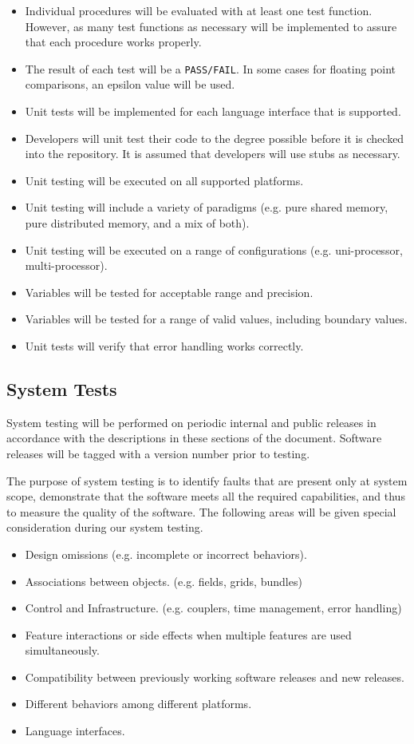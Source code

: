 \begin{itemize}
\item Individual procedures will be evaluated with at least one test function.  However,
as many test functions as necessary will be implemented to assure that 
each procedure works properly.  
\item The result of each test will be a {\tt PASS/FAIL}.  
In some cases for floating point comparisons, an epsilon value will be used.
\item Unit tests will be implemented for each language interface that is 
supported.
\item Developers will unit test their code to the degree possible  
before it is checked into the repository.  It is assumed that 
developers will use stubs as necessary.
\item Unit testing will be executed on all supported platforms.
\item Unit testing will include a variety of paradigms (e.g. pure shared memory,
pure distributed memory, and a mix of both).
\item Unit testing will be executed on a range of configurations (e.g. uni-processor,
multi-processor).
\item Variables will be tested for acceptable range and precision.
\item Variables will be tested for a range of valid values, including boundary
values.
\item Unit tests will verify that error handling works correctly.
\end{itemize}

\subsection{System Tests}

System testing will be performed on periodic internal and public releases in 
accordance with the descriptions in these sections of the document. Software 
releases will be tagged with a version number prior to testing. 

The purpose of system testing is to identify faults that are present
only at system scope, demonstrate that the software meets all the
required capabilities, and thus to measure the quality of the 
software. The following areas will be given special
consideration during our system testing.

\begin{itemize}
\item Design omissions (e.g. incomplete or incorrect behaviors).
\item Associations between objects. (e.g. fields, grids, bundles)
\item Control and Infrastructure. (e.g. couplers, time management, error handling)
\item Feature interactions or side effects when multiple features are used
simultaneously.
\item Compatibility between previously working software releases and new releases.
\item Different behaviors among different platforms.
\item Language interfaces.
\end{itemize}

